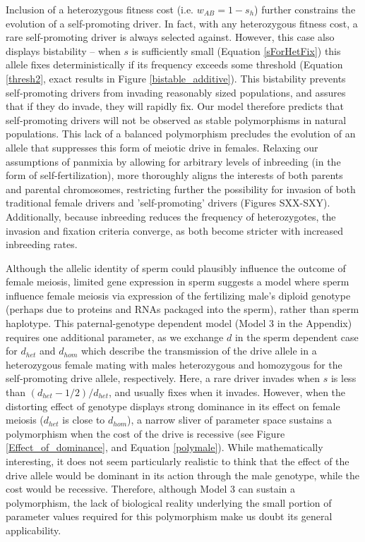 \documentclass[12pt,letterpaper]{article}
\newcommand{\gc}[1]{{ \color{red} #1}}
\newcommand{\yb}[1]{{ \color{blue} #1}}
\begin{document}
Inclusion of a heterozygous fitness cost (i.e. $w_{AB}=1-s_h$)
	further constrains the evolution of a self-promoting driver. 
In fact, with any heterozygous fitness cost, a rare self-promoting
	driver is always selected against. 
However, this case also displays bistability -- 
	when $s$ is sufficiently small (Equation \ref{sForHetFix}) this allele fixes deterministically if its 
	frequency exceeds some threshold  (Equation \ref{thresh2}, exact results in 
	Figure \ref{bistable_additive}).
This bistability prevents self-promoting drivers from invading 	
	reasonably sized populations, and assures that if they do invade, they will rapidly fix.
Our model therefore predicts that self-promoting drivers will not be
	observed as stable polymorphisms in natural populations. 
This lack of a balanced polymorphism %
	precludes the evolution of an
	allele that suppresses this form of meiotic drive in females. 
\gc{ \yb{Relaxing our assumptions of panmixia by} allowing for 
  arbitrary levels of inbreeding (in the form of self-fertilization),
  more thoroughly aligns the interests of both parents and
  parental chromosomes, restricting further the possibility for
  invasion of both traditional female drivers and 'self-promoting'
  drivers (Figures SXX-SXY). Additionally, because inbreeding reduces
  the frequency of heterozygotes, the invasion and fixation criteria
  converge, \yb{as both become stricter with increased inbreeding rates}.} \newline 

Although the allelic identity of sperm could plausibly influence the outcome of female meiosis, 
	limited gene expression in sperm \citep[e.g.][]{Joseph2004}
	suggests a model where sperm influence female meiosis via expression of the fertilizing male's
	diploid genotype (perhaps due to proteins and RNAs packaged into the sperm), rather than sperm haplotype.
This paternal-genotype dependent model (Model 3 in the Appendix) requires one additional parameter, as we exchange $d$ in the sperm dependent case for $d_{het}$ and $d_{hom}$ which describe the transmission of the drive allele in a heterozygous female mating with males heterozygous and homozygous for the self-promoting drive allele, respectively.  
Here, a rare driver invades when $s$ is less than $(d_{het}-1/2)/d_{het}$, and usually fixes when it invades.
However, when the distorting effect of genotype displays strong dominance in its
	effect on female meiosis ($d_{het}$ is close to $d_{hom}$), 
	a narrow sliver of parameter space sustains a polymorphism
	when the cost of the drive is recessive
	(see Figure \ref{Effect_of_dominance}, and Equation \ref{polymale}).  
While mathematically interesting, it does not seem particularly realistic to think that the
	effect of the drive allele would be dominant in its action through the
	male genotype, while the cost would be recessive. 
Therefore, although Model 3 can sustain a polymorphism, 
	the lack of biological reality underlying the small portion of parameter values 
	required for this polymorphism make us doubt its general applicability. \newline 
\end{document}
